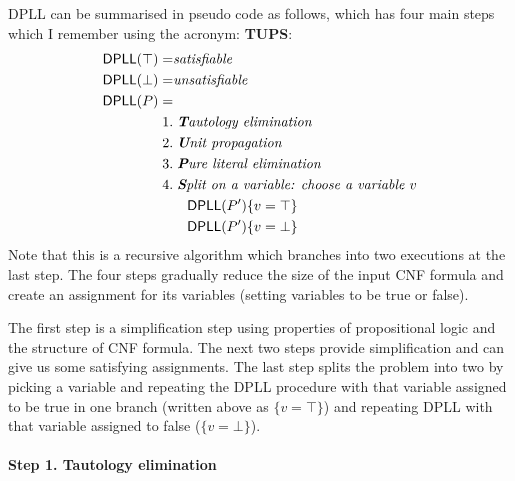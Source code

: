 \documentclass{article}
\theoremstyle{definition}
\begin{document}
DPLL can be summarised in pseudo code as follows, which
has four main steps which I remember using the acronym: \textbf{TUPS}:
%
\begin{align*}
\textsf{DPLL}(\top) = &\textit{satisfiable} \\
\textsf{DPLL}(\bot) = & \textit{unsatisfiable} \\
\textsf{DPLL}(P) = & \\
    1. & \; \textit{\textbf{T}autology elimination} \\
    2. & \; \textit{\textbf{U}nit propagation} \\
    3. & \; \textit{\textbf{P}ure literal elimination} \\
    4. & \; \textit{\textbf{S}plit on a variable: choose a variable $v$} \\
       &  \quad \textsf{DPLL}(P') \{v = \top\}  \\
       & \quad \textsf{DPLL}(P') \{v = \bot\}
\end{align*}
%
Note that this is a recursive algorithm which branches
into two executions at the last step.
The four steps gradually reduce the size of the input CNF formula and
create an assignment for its variables (setting variables to be true
or false). %

The first step is a simplification step using properties
of propositional logic and the structure of CNF 
formula. The next two steps provide simplification and can give us
some satisfying assignments.  The last step splits the problem into
two by picking a variable and repeating the DPLL procedure with that 
variable assigned to be true in one branch (written above as $\{v = \top\}$)
and repeating DPLL with that variable assigned to false ($\{v = \bot\}$).

\paragraph{Step 1. Tautology elimination}
\end{document}
